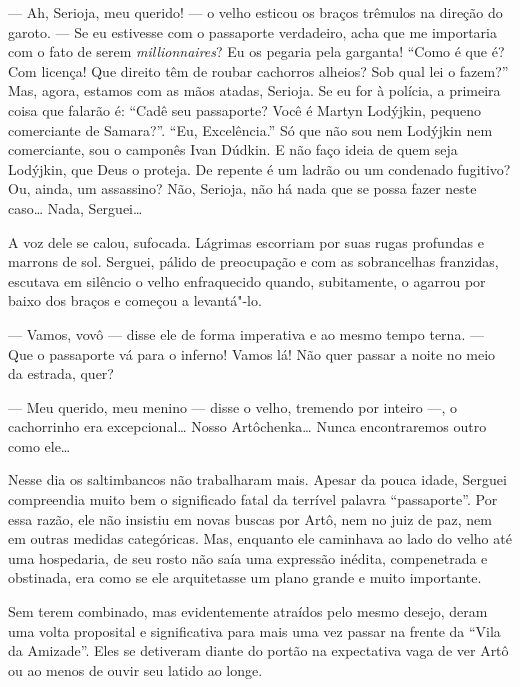 
--- Ah, Serioja, meu querido! --- o velho esticou os braços trêmulos na
direção do garoto. --- Se eu estivesse com o passaporte verdadeiro, acha
que me importaria com o fato de serem \emph{millionnaires}? Eu os pegaria
pela garganta! ``Como é que é? Com licença! Que direito têm de roubar
cachorros alheios? Sob qual lei o fazem?'' Mas, agora, estamos com as
mãos atadas, Serioja. Se eu for à polícia, a primeira coisa que falarão
é: ``Cadê seu passaporte? Você é Martyn Lodýjkin, pequeno comerciante de
Samara?''. ``Eu, Excelência.'' Só que não sou nem Lodýjkin nem
comerciante, sou o camponês Ivan Dúdkin. E não faço ideia de quem seja
Lodýjkin, que Deus o proteja. De repente é um ladrão ou um condenado
fugitivo? Ou, ainda, um assassino? Não, Serioja, não há nada que se
possa fazer neste caso\ldots{} Nada, Serguei\ldots{}

A voz dele se calou, sufocada. Lágrimas escorriam por suas rugas
profundas e marrons de sol. Serguei, pálido de preocupação e com as
sobrancelhas franzidas, escutava em silêncio o velho enfraquecido
quando, subitamente, o agarrou por baixo dos braços e começou a
levantá"-lo.

--- Vamos, vovô --- disse ele de forma imperativa e ao mesmo tempo
terna. --- Que o passaporte vá para o inferno! Vamos lá! Não quer passar a
noite no meio da estrada, quer?

--- Meu querido, meu menino --- disse o velho, tremendo por inteiro ---,
o cachorrinho era excepcional\ldots{} Nosso Artôchenka\ldots{} Nunca encontraremos
outro como ele\ldots{}


Nesse dia os saltimbancos não trabalharam mais. Apesar da pouca idade,
Serguei compreendia muito bem o significado fatal da terrível palavra
``passaporte''. Por essa razão, ele não insistiu em novas buscas por
Artô, nem no juiz de paz, nem em outras medidas categóricas. Mas,
enquanto ele caminhava ao lado do velho até uma hospedaria, de seu rosto
não saía uma expressão inédita, compenetrada e obstinada, era como se
ele arquitetasse um plano grande e muito importante.

Sem terem combinado, mas evidentemente atraídos pelo mesmo desejo, deram
uma volta proposital e significativa para mais uma vez passar na frente
da ``Vila da Amizade''. Eles se detiveram diante do portão na
expectativa vaga de ver Artô ou ao menos de ouvir seu latido ao longe.

